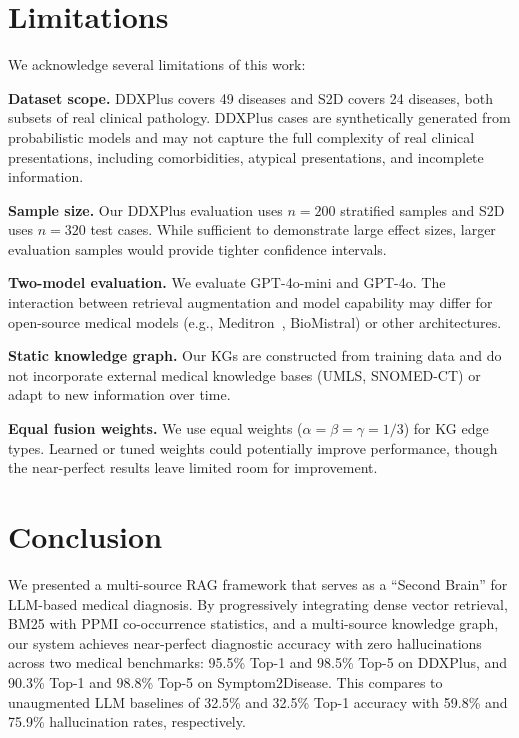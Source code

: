 \documentclass[review]{elsarticle}
\begin{document}
\section{Limitations}
\label{sec:limitations}

We acknowledge several limitations of this work:

\textbf{Dataset scope.} DDXPlus covers 49 diseases and S2D covers 24 diseases, both subsets of real clinical pathology. DDXPlus cases are synthetically generated from probabilistic models and may not capture the full complexity of real clinical presentations, including comorbidities, atypical presentations, and incomplete information.

\textbf{Sample size.} Our DDXPlus evaluation uses $n{=}200$ stratified samples and S2D uses $n{=}320$ test cases. While sufficient to demonstrate large effect sizes, larger evaluation samples would provide tighter confidence intervals.

\textbf{Two-model evaluation.} We evaluate GPT-4o-mini and GPT-4o. The interaction between retrieval augmentation and model capability may differ for open-source medical models (e.g., Meditron~\cite{chen2023meditron}, BioMistral) or other architectures.

\textbf{Static knowledge graph.} Our KGs are constructed from training data and do not incorporate external medical knowledge bases (UMLS, SNOMED-CT) or adapt to new information over time.

\textbf{Equal fusion weights.} We use equal weights ($\alpha{=}\beta{=}\gamma{=}1/3$) for KG edge types. Learned or tuned weights could potentially improve performance, though the near-perfect results leave limited room for improvement.

\section{Conclusion}
\label{sec:conclusion}

We presented a multi-source RAG framework that serves as a ``Second Brain'' for LLM-based medical diagnosis. By progressively integrating dense vector retrieval, BM25 with PPMI co-occurrence statistics, and a multi-source knowledge graph, our system achieves near-perfect diagnostic accuracy with zero hallucinations across two medical benchmarks: 95.5\% Top-1 and 98.5\% Top-5 on DDXPlus, and 90.3\% Top-1 and 98.8\% Top-5 on Symptom2Disease. This compares to unaugmented LLM baselines of 32.5\% and 32.5\% Top-1 accuracy with 59.8\% and 75.9\% hallucination rates, respectively.
\end{document}
